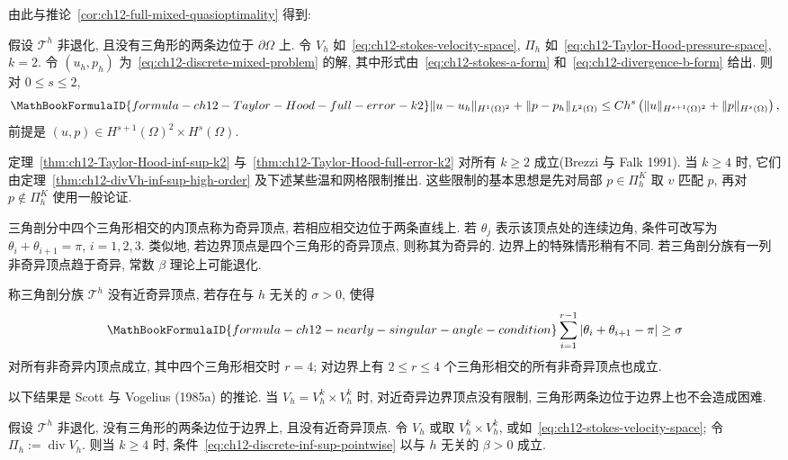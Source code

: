 由此与推论~\ref{cor:ch12-full-mixed-quasioptimality} 得到:
\begin{Theorem}
\label{thm:ch12-Taylor-Hood-full-error-k2}
假设 $\mathcal T^h$ 非退化, 且没有三角形的两条边位于 $\partial\Omega$ 上. 令 $V_h$ 如~\eqref{eq:ch12-stokes-velocity-space}, $\Pi_h$ 如~\eqref{eq:ch12-Taylor-Hood-pressure-space}, $k=2$. 令 $(u_h,p_h)$ 为~\eqref{eq:ch12-discrete-mixed-problem} 的解, 其中形式由~\eqref{eq:ch12-stokes-a-form} 和~\eqref{eq:ch12-divergence-b-form} 给出. 则对 $0\leq s\leq2$,
\[
\MathBookFormulaID{formula-ch12-Taylor-Hood-full-error-k2}
\|u-u_h\|_{H^1(\Omega)^2}+\|p-p_h\|_{L^2(\Omega)}
\leq Ch^s\left(\|u\|_{H^{s+1}(\Omega)^2}
+\|p\|_{H^s(\Omega)}\right),
\]
前提是 $(u,p)\in H^{s+1}(\Omega)^2\times H^s(\Omega)$.
\end{Theorem}

定理~\ref{thm:ch12-Taylor-Hood-inf-sup-k2} 与~\ref{thm:ch12-Taylor-Hood-full-error-k2} 对所有 $k\geq2$ 成立(Brezzi 与 Falk 1991). 当 $k\geq4$ 时, 它们由定理~\ref{thm:ch12-divVh-inf-sup-high-order} 及下述某些温和网格限制推出. 这些限制的基本思想是先对局部 $p\in\Pi_h^K$ 取 $v$ 匹配 $p$, 再对 $p\notin\Pi_h^K$ 使用一般论证.

三角剖分中四个三角形相交的内顶点称为奇异顶点, 若相应相交边位于两条直线上. 若 $\theta_j$ 表示该顶点处的连续边角, 条件可改写为 $\theta_i+\theta_{i+1}=\pi$, $i=1,2,3$. 类似地, 若边界顶点是四个三角形的奇异顶点, 则称其为奇异的. 边界上的特殊情形稍有不同. 若三角剖分族有一列非奇异顶点趋于奇异, 常数 $\beta$ 理论上可能退化.

\begin{Definition}
\label{def:ch12-nearly-singular-vertices}
称三角剖分族 $\mathcal T^h$ 没有近奇异顶点, 若存在与 $h$ 无关的 $\sigma>0$, 使得
\begin{equation}
\MathBookFormulaID{formula-ch12-nearly-singular-angle-condition}
\label{eq:ch12-nearly-singular-angle-condition}
\sum_{i=1}^{r-1}|\theta_i+\theta_{i+1}-\pi|\geq\sigma
\end{equation}
对所有非奇异内顶点成立, 其中四个三角形相交时 $r=4$; 对边界上有 $2\leq r\leq4$ 个三角形相交的所有非奇异顶点也成立.
\end{Definition}

以下结果是 Scott 与 Vogelius (1985a) 的推论. 当 $V_h=V_h^k\times V_h^k$ 时, 对近奇异边界顶点没有限制, 三角形两条边位于边界上也不会造成困难.

\begin{Theorem}
\label{thm:ch12-divVh-inf-sup-high-order}
假设 $\mathcal T^h$ 非退化, 没有三角形的两条边位于边界上, 且没有近奇异顶点. 令 $V_h$ 或取 $V_h^k\times V_h^k$, 或如~\eqref{eq:ch12-stokes-velocity-space}; 令 $\Pi_h:=\operatorname{div}V_h$. 则当 $k\geq4$ 时, 条件~\eqref{eq:ch12-discrete-inf-sup-pointwise} 以与 $h$ 无关的 $\beta>0$ 成立.
\end{Theorem}

